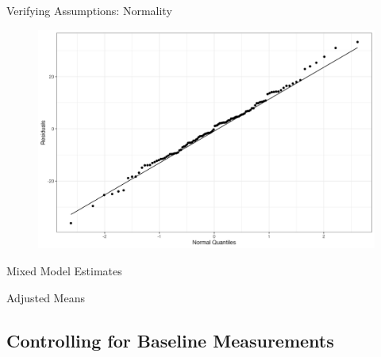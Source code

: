 \documentclass{beamer}
\begin{document}
\begin{frame}{Verifying Assumptions: Normality}
    \begin{figure}
        \centering
        \includegraphics[width=\linewidth]{report/figures/presentation/qqplot.png}
    \end{figure}
\end{frame}

\begin{frame}{Mixed Model Estimates}
    
\end{frame}

\begin{frame}{Adjusted Means}
    
\end{frame}

\subsection{Controlling for Baseline Measurements}
\end{document}

